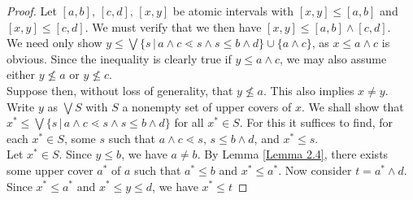 \documentclass{article}
\begin{document}
\begin{proof}
    Let $[a, b],\, [c, d],\, [x, y]$ be atomic intervals with $[x, y] \le [a, b]$ and $[x, y] \le [c, d]$. We must verify that we then have $[x, y] \le [a, b] \wedge [c, d]$. \\
    We need only show $y \le \bigvee \{s \,|\, a \wedge c \lessdot s \wedge s \le b \wedge d \} \cup \{a \wedge c\}$, as $x \le a \wedge c$ is obvious. Since the inequality is clearly true if $y \le a \wedge c$, we may also assume either $y \not \le a$ or $y \not \le c$. \\
    Suppose then, without loss of generality, that $y \not \le a$. This also implies $x \ne y$. Write $y$ as $\bigvee S$ with $S$ a nonempty set of upper covers of $x$. We shall show that $x^* \le \bigvee \{s \,|\, a \wedge c \lessdot s \wedge s \le b \wedge d \}$ for all $x^* \in S$. For this it suffices to find, for each $x^* \in S$, some $s$ such that $a \wedge c \lessdot s$, $s \le b \wedge d$, and $x^* \le s$. \\
    Let $x^* \in S$. Since $y \le b$, we have $a \ne b$. By Lemma \ref{Lemma 2.4}, there exists some upper cover $a^*$ of $a$ such that $a^* \le b$ and $x^* \le a^*$. Now consider $t = a^* \wedge d$. Since $x^* \le a^*$ and $x^* \le y \le d$, we have $x^* \le t$
\end{proof}
\end{document}
